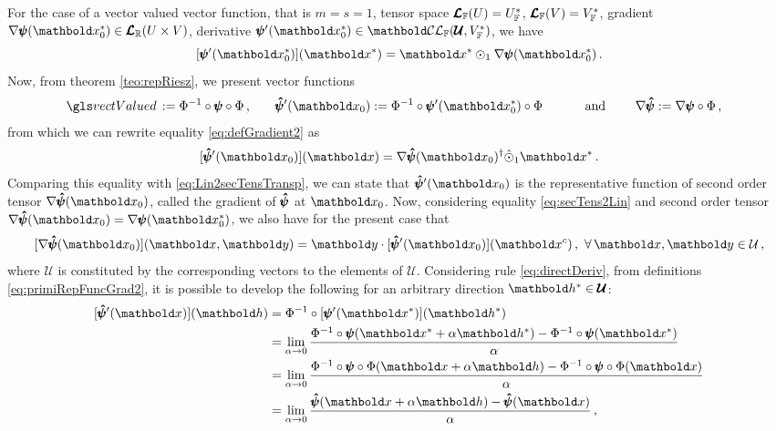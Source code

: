  For the case of a vector valued vector function, that is $m=s=1$, tensor space $\pmb{\mathcal{L}}_{\mathbb{F}}(U)=U^*_{\mathbb{F}}$, $\pmb{\mathcal{L}}_{\mathbb{F}}(V)=V^*_{\mathbb{F}}$, gradient $\fua{\nabla\tnr{\psi}}{\vto{x}_0^*}\in\ete{\cam{R}}{U\times V}$, derivative $\fua{\tnr{\psi}'}{\vto{x}_0^*}\in\evlc{\cam{F}}{\pmb{\mathcal{U}}}{V^*_\cam{F}}$, we have
\begin{equation}\label{eq:defGradient2}
[\fua{\tnr{\psi}'}{\vto{x}_0^*}](\vto{x}^*) = \vto{x}^*\odot_1\fua{\nabla\tnr{\psi}}{\vto{x}_0^*}\,.
\end{equation}
Now, from theorem \ref{teo:repRiesz}, we present vector functions
\begin{alignat}{4} \label{eq:primiRepFuncGrad2}
\gloref{vectValued}:=\Phi^{-1}\circ\tnr{\psi}\circ\Phi\,, &\qquad   \tnr{\hat\psi}'(\vto{x}_0):=\Phi^{-1}\circ\fua{\tnr{\psi}'}{\vto{x}_0^*}\circ\Phi  &\qquad \text{ and } \qquad& \nabla\tnr{\hat{\psi}}:=\nabla\tnr{\psi}\circ\Phi \,,
\end{alignat}
from which we can rewrite equality \eqref{eq:defGradient2} as
\begin{equation}\label{eq:derivVecGradVec}
\fua{[\tnr{\hat\psi}'(\vto{x}_0)]}{\vto{x}} = \fua{ \nabla\tnr{\hat{\psi}}}{\vto{x}_0}^\dagger\hat{\odot}_1\vto{x}^*\,.
\end{equation}
Comparing this equality with \eqref{eq:Lin2secTensTransp}, we can state that $\tnr{\hat\psi}'(\vto{x}_0)$ is the representative function of second order tensor $\fua{ \nabla\tnr{\hat{\psi}}}{\vto{x}_0}$, called the gradient of  $\pmb{\hat{\psi}}$ at $\vto{x}_0$. Now, considering equality \eqref{eq:secTens2Lin} and second order tensor $\fua{\nabla\tnr{\hat{\psi}}}{\vto{x}_0}=\fua{\nabla\tnr{\psi}}{\vto{x}_0^*}$, we also have for the present case that 
\begin{equation}\label{eq:gradFuncRep}
\fua{[\fua{\nabla\tnr{\hat{\psi}}}{\vto{x}_0}]}{\vto{x},\vto{y}}=\vto{y}\cdot\fua{[\tnr{\hat\psi}'(\vto{x}_0)]}{\vto{x}^{c}}\,,\,\,\forall\, \vto{x},\vto{y}\in\mathcal{U}\,,
\end{equation}
where $\mathcal{U}$ is constituted by the corresponding vectors to the elements of $\pmb{\mathcal{U}}$. Considering rule \eqref{eq:directDeriv}, from  definitions \eqref{eq:primiRepFuncGrad2}, it is possible to develop the following for an arbitrary direction $\vto{h}^*\in\pmb{\mathcal{U}}$:  
\begin{align}\label{eq:derivRep}
\fua{[\tnr{\hat\psi}'(\vto{x})]}{\vto{h}}&=\Phi^{-1}\circ\fua{[\fua{\tnr{\psi}'}{\vto{x}^*}]}{\vto{h}^*}\nonumber\\
&=\lim_{\alpha\to 0} \dfrac{\fua{\Phi^{-1}\circ\tnr{\psi}}{\vto{x}^*+\alpha\vto{h}^*}-\fua{\Phi^{-1}\circ\tnr{\psi}}{\vto{x}^*}}{\alpha}\nonumber\\
&=\lim_{\alpha\to 0} \dfrac{\fua{\Phi^{-1}\circ\tnr{\psi}\circ\Phi}{\vto{x}+\alpha\vto{h}}-\fua{\Phi^{-1}\circ\tnr{\psi}\circ\Phi}{\vto{x}}}{\alpha}\nonumber\\
&=\lim_{\alpha\to 0} \dfrac{\fua{\tnr{\hat\psi}}{\vto{x}+\alpha\vto{h}}-\fua{\tnr{\hat\psi}}{\vto{x}}}{\alpha}\,,
\end{align}
